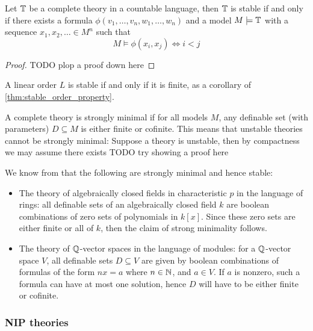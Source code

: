 \documentclass[../main.tex]{subfiles}
\begin{document}
\begin{thm}\label{thm:stable_order_property}
  Let $\mathbb{T}$ be a complete theory in a countable language, then $\mathbb{T}$ is stable if and only
  if there exists a formula $\phi(v_1,\dots,v_n,w_1,\dots,w_n)$ and a model $M \models \mathbb{T}$ with
  a sequence $x_1,x_2,\dots \in M^n$ such that
  \begin{equation*}
    M \models \phi(x_i,x_j) \iff i < j
  \end{equation*}
\end{thm}
\begin{proof}
  {\color{orange} TODO plop a proof down here}
\end{proof}

\begin{exmp}
  A linear order $L$ is stable if and only if it is finite, as a corollary of
  \cref{thm:stable_order_property}.
\end{exmp}

\begin{exmp}
  A complete theory is strongly minimal if for all models $M$, any definable set (with parameters)
  $D \subseteq M$ is either finite or cofinite. This means that unstable theories cannot be
  strongly minimal: Suppose a theory is unstable, then by compactness we may assume there exists
  {\color{orange} TODO try showing a proof here}

  We know from \cite{marker02} that the following are strongly minimal and hence stable:
  \begin{itemize}
    \item The theory of algebraically closed fields in characteristic $p$ in the language of rings:
      all definable sets of an algebraically closed field $k$ are boolean combinations of zero sets
      of polynomials in $k[x]$. Since these zero sets are either finite or all of $k$, then the
      claim of strong minimality follows.
    \item The theory of $\mathbb{Q}$-vector spaces in the language of modules: for a $\mathbb{Q}$-vector space $V$,
      all definable sets $D \subseteq V$ are given by boolean combinations of formulas of the form
      $nx = a$ where $n \in \mathbb{N}$, and $a \in V$. If $a$ is nonzero, such a formula can have at most
      one solution, hence $D$ will have to be either finite or cofinite.
  \end{itemize}
\end{exmp}

\subsubsection{NIP theories}
\label{ssub:nip_theories}
\end{document}
